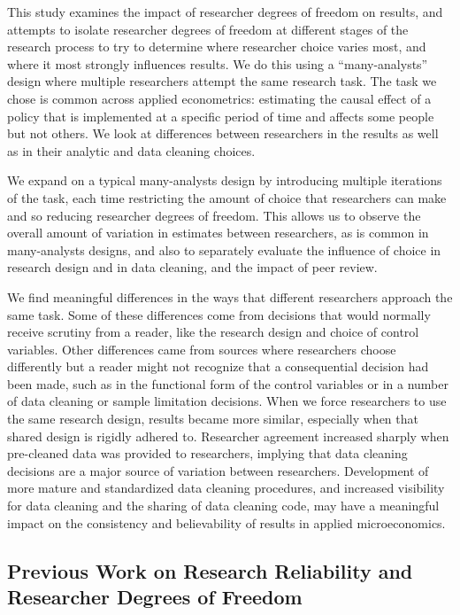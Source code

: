 \documentclass[
  letterpaper,
  DIV=11,
  numbers=noendperiod]{scrartcl}
\begin{document}
This study examines the impact of researcher degrees of freedom on
results, and attempts to isolate researcher degrees of freedom at
different stages of the research process to try to determine where
researcher choice varies most, and where it most strongly influences
results. We do this using a ``many-analysts'' design where multiple
researchers attempt the same research task. The task we chose is common
across applied econometrics: estimating the causal effect of a policy
that is implemented at a specific period of time and affects some people
but not others. We look at differences between researchers in the
results as well as in their analytic and data cleaning choices.

We expand on a typical many-analysts design by introducing multiple
iterations of the task, each time restricting the amount of choice that
researchers can make and so reducing researcher degrees of freedom. This
allows us to observe the overall amount of variation in estimates
between researchers, as is common in many-analysts designs, and also to
separately evaluate the influence of choice in research design and in
data cleaning, and the impact of peer review.

We find meaningful differences in the ways that different researchers
approach the same task. Some of these differences come from decisions
that would normally receive scrutiny from a reader, like the research
design and choice of control variables. Other differences came from
sources where researchers choose differently but a reader might not
recognize that a consequential decision had been made, such as in the
functional form of the control variables or in a number of data cleaning
or sample limitation decisions. When we force researchers to use the
same research design, results became more similar, especially when that
shared design is rigidly adhered to. Researcher agreement increased
sharply when pre-cleaned data was provided to researchers, implying that
data cleaning decisions are a major source of variation between
researchers. Development of more mature and standardized data cleaning
procedures, and increased visibility for data cleaning and the sharing
of data cleaning code, may have a meaningful impact on the consistency
and believability of results in applied microeconomics.

\hypertarget{previous-work-on-research-reliability-and-researcher-degrees-of-freedom}{%
\subsection{Previous Work on Research Reliability and Researcher Degrees
of
Freedom}\label{previous-work-on-research-reliability-and-researcher-degrees-of-freedom}}
\end{document}
